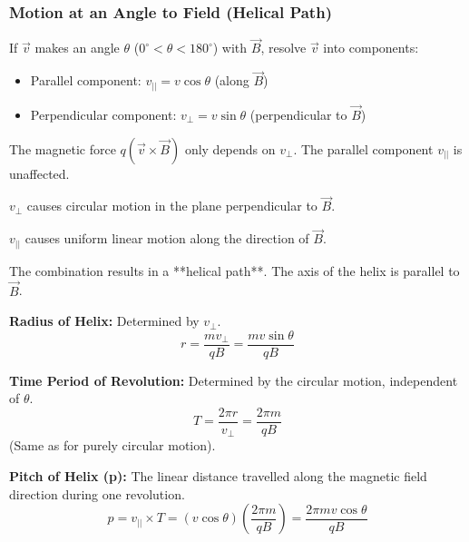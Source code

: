 \begin{frame}[t]
    \frametitle{\textcolor{deepnavy}{\textbf{Motion at an Angle to Field (Helical Path)}}}
    \renewcommand{\familydefault}{\rmdefault}
    \small

      \item<+-> If $\vec{v}$ makes an angle $\theta$ ($0^\circ < \theta < 180^\circ$) with $\vec{B}$, resolve $\vec{v}$ into components:
        \begin{itemize}
              \item Parallel component: $v_{||} = v \cos\theta$ (along $\vec{B}$)
              \item Perpendicular component: $v_{\perp} = v \sin\theta$ (perpendicular to $\vec{B}$)
        \end{itemize}

    \item<+-> The magnetic force $q(\vec{v} \times \vec{B})$ only depends on $v_{\perp}$.   The parallel component $v_{||}$ is unaffected.
      \item<+-> $v_{\perp}$ causes circular motion in the plane perpendicular to $\vec{B}$.
      \item<+-> $v_{||}$ causes uniform linear motion along the direction of $\vec{B}$.
      \item<+-> The combination results in a **helical path**.   The axis of the helix is parallel to $\vec{B}$.

      \item<+-> \textbf{Radius of Helix:} Determined by $v_{\perp}$.
          \begin{equation*} r = \frac{m v_{\perp}}{qB} = \frac{m v \sin\theta}{qB} \end{equation*}
      \item<+-> \textbf{Time Period of Revolution:} Determined by the circular motion, independent of $\theta$.
          \begin{equation*} T = \frac{2\pi r}{v_{\perp}} = \frac{2\pi m}{qB} \end{equation*} (Same as for purely circular motion).
      \item<+-> \textbf{Pitch of Helix (p):} The linear distance travelled along the magnetic field direction during one revolution.
          \begin{equation*} p = v_{||} \times T = (v \cos\theta) \left( \frac{2\pi m}{qB} \right) = \frac{2\pi m v \cos\theta}{qB} \end{equation*}
\end{frame}

